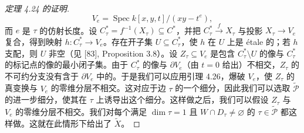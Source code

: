 \begin{proof}[定理 4.24 的证明]
\[
V_e=\operatorname{Spec}k[x,y,t]/(xy-t^e),
\]
而 $e$ 是 $\tau$ 的仿射长度。设 $C^*_\tau=f^{-1}(X_\tau)\subseteq C^*$，并把 $C^*_\tau\xrightarrow{f}X_\tau$ 与投影 $X_\tau\to V_e$ 复合，得到映射 $h:C^*_\tau\to V_e$。存在开子集 $U\subseteq C^*_\tau$，使 $h$ 在 $U$ 上是 étale 的；若 $h$ 支配，则 $U$ 非空（见 [83], Proposition 3.8）。设 $Z_\tau\subseteq V_e$ 是包含 $C^*_\tau\setminus U$ 的像与 $C^*_\tau$ 的标记点的像的最小闭子集。由于 $C^*_\tau$ 的像与 $\partial V_e$（由 $t=0$ 给出）不相交，$Z_\tau$ 的不可约分支没有含于 $\partial V_e$ 中的。于是我们可以应用引理 4.26，爆破 $V_e$，使 $Z_\tau$ 的真变换与 $V_e$ 的零维分层不相交。这对应于边 $\tau$ 的一个细分，因此我们可以选取 $\widetilde{\mathcal P}$ 的进一步细分，使其在 $\tau$ 上诱导出这个细分。这样做之后，我们可以假设 $Z_\tau$ 与 $V_e$ 的零维分层不相交。我们对每个满足 $\dim\tau=1$ 且 $W\cap D_\tau\neq\varnothing$ 的 $\tau\in\widetilde{\mathcal P}$ 都这样做。这就在此情形下给出了 $\widetilde X$。


\end{proof}
